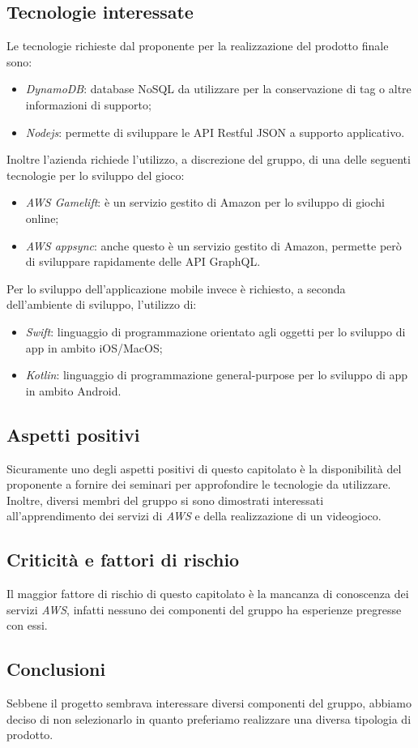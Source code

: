 \subsection{Tecnologie interessate}
Le tecnologie richieste dal proponente per la realizzazione del prodotto finale sono:
\begin{itemize}
	\item \textit{DynamoDB}: database NoSQL da utilizzare per la conservazione di tag o altre informazioni di supporto;
	\item \textit{Nodejs}: permette di sviluppare le API Restful JSON a supporto applicativo.
\end{itemize}
Inoltre l'azienda richiede l'utilizzo, a discrezione del gruppo, di una delle seguenti tecnologie per lo sviluppo del gioco:
\begin{itemize}
	\item \textit{AWS Gamelift}: è un servizio gestito di Amazon per lo sviluppo di giochi online;
	\item \textit{AWS appsync}: anche questo è un servizio gestito di Amazon, permette però di sviluppare rapidamente delle API GraphQL.
\end{itemize}
Per lo sviluppo dell'applicazione mobile invece è richiesto, a seconda dell'ambiente di sviluppo, l'utilizzo di:
\begin{itemize}
	\item \textit{Swift}: linguaggio di programmazione orientato agli oggetti per lo sviluppo di app in ambito iOS/MacOS;
	\item \textit{Kotlin}: linguaggio di programmazione general-purpose per lo sviluppo di app in ambito Android.
\end{itemize}


\subsection{Aspetti positivi}
Sicuramente uno degli aspetti positivi di questo capitolato è la disponibilità del proponente a fornire dei seminari per approfondire le tecnologie da utilizzare.
Inoltre, diversi membri del gruppo si sono dimostrati interessati all'apprendimento dei servizi di \textit{AWS} e della realizzazione di un videogioco.


\subsection{Criticità e fattori di rischio}
Il maggior fattore di rischio di questo capitolato è la mancanza di conoscenza dei servizi \textit{AWS}, infatti nessuno dei componenti del gruppo ha esperienze pregresse con essi.


\subsection{Conclusioni}
Sebbene il progetto sembrava interessare diversi componenti del gruppo, abbiamo deciso di non selezionarlo in quanto preferiamo realizzare una diversa tipologia di prodotto.
\newpage
